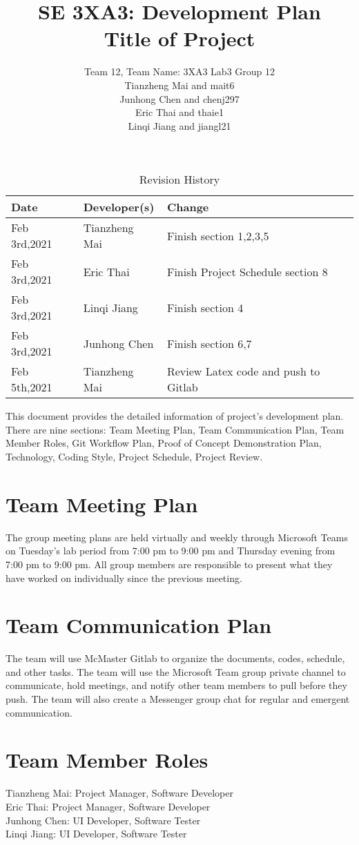 \documentclass{article}
\title{SE 3XA3: Development Plan\\Title of Project}
\author{Team 12, Team Name: 3XA3 Lab3 Group 12
		\\ Tianzheng Mai and mait6
		\\ Junhong Chen and chenj297
		\\ Eric Thai and thaie1
		\\ Linqi Jiang and jiangl21
}
\date{}
\begin{document}
\begin{table}[hp]
\caption{Revision History} \label{TblRevisionHistory}
\begin{tabularx}{\textwidth}{llX}
\toprule
\textbf{Date} & \textbf{Developer(s)} & \textbf{Change}\\
\midrule
Feb 3rd,2021 & Tianzheng Mai & Finish section 1,2,3,5\\
Feb 3rd,2021 & Eric Thai & Finish Project Schedule section 8\\
Feb 3rd,2021 & Linqi Jiang & Finish section 4\\
Feb 3rd,2021 & Junhong Chen & Finish section 6,7\\
Feb 5th,2021 & Tianzheng Mai & Review Latex code and push to Gitlab\\
\bottomrule
\end{tabularx}
\end{table}

\newpage

\maketitle

This document provides the detailed information of project's development plan. There are nine sections: Team Meeting Plan, Team Communication Plan, Team Member Roles, Git Workflow Plan, Proof of Concept Demonstration Plan, Technology, Coding Style, Project Schedule, Project Review. 

\section{Team Meeting Plan}
The group meeting plans are held virtually and weekly through Microsoft Teams on Tuesday’s lab period from 7:00 pm to 9:00 pm and Thursday evening from 7:00 pm to 9:00 pm. All group members are responsible to present what they have worked on individually since the previous meeting. 
\section{Team Communication Plan}
The team will use McMaster Gitlab to organize the documents, codes, schedule, and other tasks. The team will use the Microsoft Team group private channel to communicate, hold meetings, and notify other team members to pull before they push. The team will also create a Messenger group chat for regular and emergent communication. 
\section{Team Member Roles}
Tianzheng Mai: Project Manager, Software Developer\\
Eric Thai: Project Manager, Software Developer\\
Junhong Chen: UI Developer, Software Tester\\
Linqi Jiang: UI Developer, Software Tester\\
\end{document}
